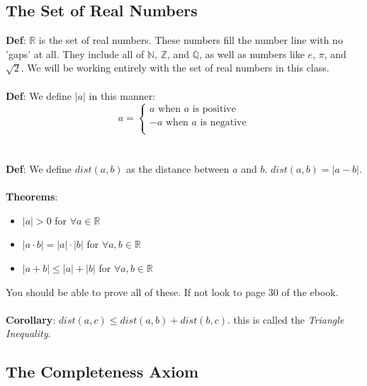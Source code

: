 \documentclass{article}
\begin{document}
\pagebreak

\subsection{The Set of Real Numbers}
\textbf{Def}: $\mathbb{R}$ is the set of real numbers. These numbers fill the number line with no 'gaps' at all. They include all of $\mathbb{N}$, $\mathbb{Z}$, and $\mathbb{Q}$, as well as numbers like $e$, $\pi$, and $\sqrt{2}$. We will be working entirely with the set of real numbers in this class.
\\\\
\textbf{Def}: We define $|a|$ in this manner:
\begin{equation*}
a=
\begin{cases}
a \text{ when }a\text{ is positive}\\
-a \text{ when }a\text{ is negative}\\
\end{cases}
\end{equation*}
\\\\
\textbf{Def}: We define $dist(a,b)$ as the distance between $a$ and $b$. $dist(a,b)=|a-b|$. 
\\\\
\textbf{Theorems}:
\begin{itemize}
\item $|a|>0$ for $\forall a\in \mathbb{R}$
\item $|a\cdot b|=|a|\cdot |b|$ for $\forall a,b\in \mathbb{R}$
\item $|a+b|\leq |a|+|b|$ for $\forall a,b\in \mathbb{R}$
\end{itemize}
You should be able to prove all of these. If not look to page 30 of the ebook.
\\\\
\textbf{Corollary}: $dist(a,c)\leq dist(a,b)+dist(b,c)$. this is called the \emph{Triangle Inequality}.

\subsection{The Completeness Axiom}
\end{document}
